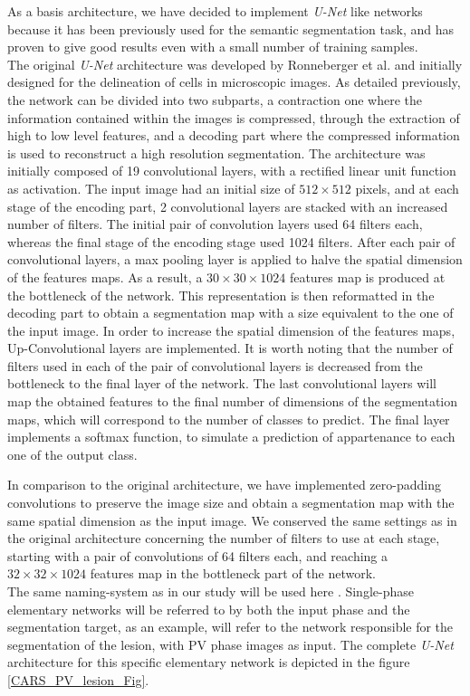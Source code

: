 As a basis architecture, we have decided to implement \emph{U-Net} like
networks because it has been previously used for the semantic
segmentation task, and has proven to give good results even with a
small number of training samples. \\
The original \emph{U-Net} architecture was developed by Ronneberger et
al. \cite{Ronneberger2015} and initially designed for the
delineation of cells in microscopic images. As detailed previously, the
network can be divided into two subparts, a contraction one where the
information contained within the images is compressed, through the
extraction of high to low level features, and a decoding part where the
compressed information is used to reconstruct a high resolution
segmentation. The architecture was initially composed of 19
convolutional layers, with a rectified linear unit function as
activation. The input image had an initial size of $ 512\times512 $ pixels, and
at each stage of the encoding part, 2 convolutional layers are stacked
with an increased number of filters. The initial pair of convolution
layers used 64 filters each, whereas the final stage of the encoding
stage used 1024 filters. After each pair of convolutional layers, a max
pooling layer is applied to halve the spatial dimension of the features
maps. As a result, a $ 30\times30\times1024 $ features map is produced at the
bottleneck of the network. This representation is then reformatted in
the decoding part to obtain a segmentation map with a size equivalent to
the one of the input image. In order to increase the spatial dimension
of the features maps, Up-Convolutional layers are implemented. It is worth
noting that the number of filters used in each of the pair of
convolutional layers is decreased from the bottleneck to the final layer
of the network. The last convolutional layers will map the obtained
features to the final number of dimensions of the segmentation maps,
which will correspond to the number of classes to predict. The final
layer implements a softmax function, to simulate a prediction of
appartenance to each one of the output class.

In comparison to the original architecture, we have implemented
zero-padding convolutions to preserve the image size and obtain a
segmentation map with the same spatial dimension as the input image. We
conserved the same settings as in the original architecture concerning
the number of filters to use at each stage, starting with a pair of
convolutions of 64 filters each, and reaching a $ 32\times32\times1024 $ features map
in the bottleneck part of the network. \\
The same naming-system as in our study will be used
here \cite{Ouhmich2019}. Single-phase elementary networks will be referred to by both the
input phase and the segmentation target, as an example,  will
refer to the network responsible for the segmentation of the lesion,
with PV phase images as input. The complete \emph{U-Net}
architecture for this specific elementary network is depicted in the figure \ref{CARS_PV_lesion_Fig}.

